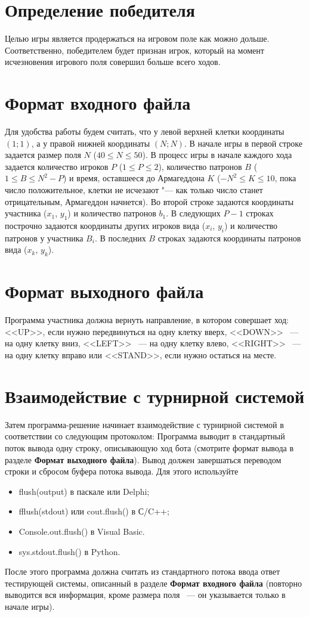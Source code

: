 \documentclass[a4paper,12pt]{article}
\begin{document}
\section{Определение победителя}
Целью игры является продержаться на игровом поле как можно дольше. Соответственно, победителем будет признан игрок, который на момент исчезновения игрового поля совершил больше всего ходов.

\section{Формат входного файла}
Для удобства работы будем считать, что у левой верхней клетки координаты $(1;1)$, а у правой нижней координаты $(N;N)$. В начале игры в первой строке задается размер поля $N$ ($40 \leq N \leq 50$).
В процесс игры в начале каждого хода задается количество игроков $P$ ($1 \leq P \leq 2$), количество патронов $B$ ($1 \leq B \leq N^2 - P$) и время, оставшееся до Армагеддона $K$ ($-N^2 \leq K \leq 10$, пока число положительное, клетки не исчезают "--- как только число станет отрицательным, Армагеддон начнется).
Во второй строке задаются координаты участника ($x_1$, $y_1$) и количество патронов $b_1$.
В следующих $P-1$ строках построчно задаются координаты других игроков вида ($x_i$, $y_i$) и количество патронов у участника $B_i$.
В последних $B$ строках задаются координаты патронов вида ($x_k$, $y_k$).

\section{Формат выходного файла}
Программа участника должна вернуть направление, в котором совершает ход: <<UP>>, если нужно передвинуться на одну клетку вверх, <<DOWN>> ~--- на одну клетку вниз, <<LEFT>> ~--- на одну клетку влево, <<RIGHT>> ~--- на одну клетку вправо или <<STAND>>, если нужно остаться на месте.

\section{Взаимодействие с турнирной системой}
Затем программа-решение начинает взаимодействие с турнирной системой в соответствии со следующим протоколом:
Программа выводит в стандартный поток вывода одну строку, описывающую ход бота (смотрите формат вывода в разделе \textbf{Формат выходного файла}). Вывод должен завершаться переводом строки и сбросом буфера потока
вывода. Для этого используйте
\begin{itemize}
\item flush(output) в паскале или Delphi;
\item fflush(stdout) или cout.flush() в С/C++;
\item Console.out.flush() в Visual Basic.
\item sys.stdout.flush() в Python.
\end{itemize}
После этого программа должна считать из стандартного потока ввода ответ тестирующей системы, описанный в разделе \textbf{Формат входного файла} (повторно выводится вся информация, кроме размера поля ~--- он указывается только в начале игры).
\end{document}
